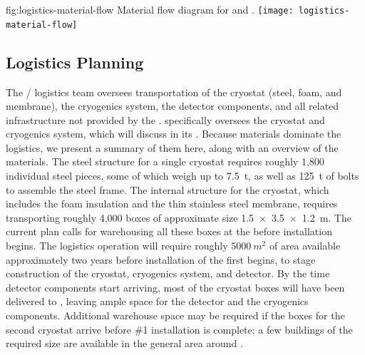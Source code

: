  
\begin{dunefigure}
{fig:logistics-material-flow}
  {Material flow diagram for  and . }
 \texttt{[image: logistics-material-flow]}
\end{dunefigure}

\subsection{Logistics Planning}
\label{sec:fdsp-tc-logPln}

The / logistics team oversees transportation of the cryostat (steel, foam, and membrane), the cryogenics system, the  detector components, and all related infrastructure not provided by the . 
 specifically oversees the cryostat and cryogenics system, which  will discuss in its %
. Because  materials dominate the logistics, we present a summary of them here, along with an overview of the  materials.  
The steel structure for a single  cryostat requires roughly 1,800 individual steel pieces,  some of which weigh up to \SI{7.5}{t}, as well as \SI{125}{t} of bolts to assemble the steel frame. 
The internal structure for the cryostat, which includes the foam insulation and the thin stainless steel membrane, requires transporting roughly 4,000 boxes of approximate size  \SI{1.5x3.5x1.2}{\meter}. %
 The current plan calls for warehousing all these boxes at the  before installation begins. 
The logistics operation will require roughly $\SI{5000}{m^2}$ of area available approximately two years before installation of the first  begins, to stage construction of the cryostat, cryogenics system, and detector. 
By the time detector components start arriving, most of the cryostat boxes will have been delivered to , leaving ample space for the detector and the cryogenics components. 
Additional warehouse space may be required if the boxes for the second cryostat arrive before   \#1 installation is complete; a few buildings of the required size are available in the general area around . 

